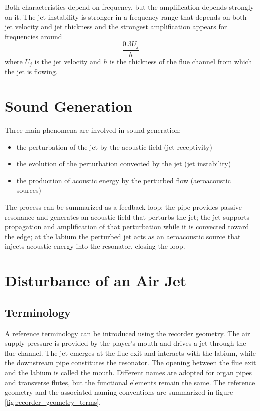 Both characteristics depend on frequency, but the amplification depends strongly on it. The jet instability is stronger in a frequency range that depends on both jet velocity and jet thickness and the strongest amplification appears for frequencies around
\[
\frac{0.3U_j}{h}
\]
where \( U_j \) is the jet velocity and \( h \) is the thickness of the flue channel from which the jet is flowing. 

\section{Sound Generation}

Three main phenomena are involved in sound generation:

\begin{itemize}
    \item the perturbation of the jet by the acoustic field (jet receptivity)
    \item the evolution of the perturbation convected by the jet (jet instability)
    \item the production of acoustic energy by the perturbed flow (aeroacoustic sources)
\end{itemize}

The process can be summarized as a feedback loop: the pipe provides passive resonance and generates an acoustic field that perturbs the jet; the jet supports propagation and amplification of that perturbation while it is convected toward the edge; at the labium the perturbed jet acts as an aeroacoustic source that injects acoustic energy into the resonator, closing the loop. 

\section{Disturbance of an Air Jet}

\subsection{Terminology}

A reference terminology can be introduced using the recorder geometry. The air supply pressure is provided by the player’s mouth and drives a jet through the flue channel. The jet emerges at the flue exit and interacts with the labium, while the downstream pipe constitutes the resonator. The opening between the flue exit and the labium is called the mouth. Different names are adopted for organ pipes and transverse flutes, but the functional elements remain the same. The reference geometry and the associated naming conventions are summarized in figure \ref{fig:recorder_geometry_terms}.

